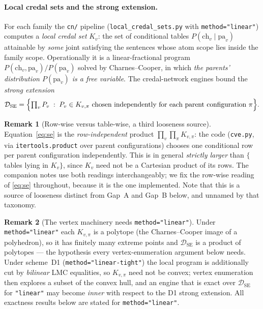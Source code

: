 \documentclass[11pt]{article}
\theoremstyle{definition}
\newtheorem{remark}{Remark}
\newcommand{\DSE}{\mathcal{D}_{\mathrm{SE}}}
\newcommand{\ch}{\mathrm{ch}}
\newcommand{\pa}{\mathrm{pa}}
\begin{document}
\paragraph{Local credal sets and the strong extension.} For each family the \texttt{cn/} pipeline
(\texttt{local\_credal\_sets.py} with \texttt{method="linear"}) computes a \emph{local credal
set} $K_v$: the set of conditional tables $P(\ch_v\mid\pa_v)$ attainable by \emph{some} joint satisfying
the sentences whose atom scope lies inside the family scope. Operationally it is a linear-fractional
program $P(\ch_v,\pa_v)/P(\pa_v)$ solved by Charnes--Cooper, in which \emph{the parents'
distribution $P(\pa_v)$ is a free variable}. The credal-network engines bound the \emph{strong
extension}
\begin{equation}\label{eq:se}
  \DSE=\Bigl\{\textstyle\prod_v P_v\;:\;P_v\in K_{v,\pi}\text{ chosen independently for each
  parent configuration }\pi\Bigr\}.
\end{equation}

\begin{remark}[Row-wise versus table-wise, a third looseness source]\label{rem:rowwise}
Equation~\eqref{eq:se} is the \emph{row-independent} product $\prod_v\prod_\pi K_{v,\pi}$: the code
(\texttt{cve.py}, via \texttt{itertools.product} over parent configurations) chooses one conditional
row per parent configuration independently. This is in general \emph{strictly larger} than
$\{$tables lying in $K_v\}$, since $K_v$ need not be a Cartesian product of its rows. The companion
notes use both readings interchangeably; we fix the row-wise reading of \eqref{eq:se} throughout,
because it is the one implemented. Note that this is a source of looseness distinct from Gap~A and
Gap~B below, and unnamed by that taxonomy.
\end{remark}

\begin{remark}[The vertex machinery needs \texttt{method="linear"}]\label{rem:d1convex}
Under \texttt{method="linear"} each $K_{v,\pi}$ is a polytope (the Charnes--Cooper image of a
polyhedron), so it has finitely many extreme points and $\DSE$ is a product of polytopes --- the
hypothesis every vertex-enumeration argument below needs. Under scheme~D1
(\texttt{method="linear-tight"}) the local program is additionally cut by \emph{bilinear} LMC
equalities, so $K_{v,\pi}$ need not be convex; vertex enumeration then explores a subset of the
convex hull, and an engine that is exact over $\DSE$ for \texttt{"linear"} may become \emph{inner}
with respect to the D1 strong extension. All exactness results below are stated for
\texttt{method="linear"}.
\end{remark}
\end{document}
